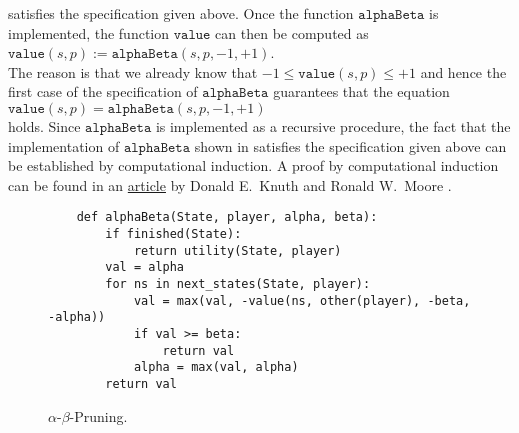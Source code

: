 satisfies the specification given above.  Once the function $\texttt{alphaBeta}$ is implemented, the function
$\texttt{value}$ can then be computed as 
\\[0.2cm]
\hspace*{1.3cm}
$\texttt{value}(s, p ) := \texttt{alphaBeta}(s, p, -1, +1)$.
\\[0.2cm]
The reason is that we already know that $-1 \leq \texttt{value}(s,p) \leq +1$ and hence the first case of the
specification of $\texttt{alphaBeta}$ guarantees that the equation
\\[0.2cm]
\hspace*{1.3cm}
$\texttt{value}(s,p) = \texttt{alphaBeta}(s,p,-1,+1)$
\\[0.2cm]
holds.  Since $\texttt{alphaBeta}$ is implemented as a recursive procedure, 
the fact that the implementation of $\texttt{alphaBeta}$ shown in  satisfies the
specification given above can be established by computational induction.  A proof by computational induction
can be found in an
\href{https://pdfs.semanticscholar.org/dce2/6118156e5bc287bca2465a62e75af39c7e85.pdf}{article} by Donald
E.~Knuth and Ronald W.~Moore \cite{knuth:1975}. 



\begin{figure}[!ht]
\centering
\begin{verbatim}
    def alphaBeta(State, player, alpha, beta):
        if finished(State):
            return utility(State, player)
        val = alpha
        for ns in next_states(State, player):
            val = max(val, -value(ns, other(player), -beta, -alpha))
            if val >= beta:
                return val
            alpha = max(val, alpha)
        return val
\end{verbatim}
\caption{$\alpha$-$\beta$-Pruning.}
\label{fig:Alpha-Beta-Pruning.ipynb:alphaBeta}
\end{figure}
\FloatBarrier

